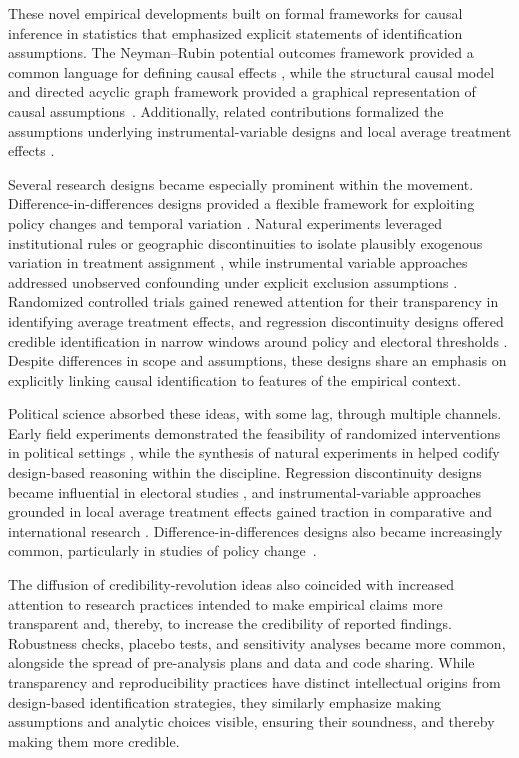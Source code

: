 \documentclass[12pt]{article}
\begin{document}
These novel empirical developments built on formal frameworks for causal inference in statistics that emphasized explicit statements of identification assumptions. The Neyman–Rubin potential outcomes framework provided a common language for defining causal effects \citep{rubin1974, holland1986}, while the structural causal model and directed acyclic graph framework provided a graphical representation of causal assumptions~\citep{pearl2009Causality}. Additionally, related contributions formalized the assumptions underlying instrumental-variable designs and local average treatment effects \citep{imbens1994identification}. 

Several research designs became especially prominent within the movement. Difference-in-differences designs provided a flexible framework for exploiting policy changes and temporal variation \citep{card1994minimumwage}. Natural experiments leveraged institutional rules or geographic discontinuities to isolate plausibly exogenous variation in treatment assignment \citep{dell2010persistent}, while instrumental variable approaches addressed unobserved confounding under explicit exclusion assumptions \citep{acemoglu2001colonial}. Randomized controlled trials gained renewed attention for their transparency in identifying average treatment effects, and regression discontinuity designs offered credible identification in narrow windows around policy and electoral thresholds \citep{lee2008rd}. Despite differences in scope and assumptions, these designs share an emphasis on explicitly linking causal identification to features of the empirical context.

Political science absorbed these ideas, with some lag, through multiple channels. Early field experiments demonstrated the feasibility of randomized interventions in political settings \citep{gerber2000field, wantchekon2003clientelism}, while the synthesis of natural experiments in \citet{dunning2012natural} helped codify design-based reasoning within the discipline. Regression discontinuity designs became influential in electoral studies \citep{eggers2015validity}, and instrumental-variable approaches grounded in local average treatment effects gained traction in comparative and international research \citep{sovey2011instrumental}. Difference-in-differences designs also became increasingly common, particularly in studies of policy change~\citep{bechtel2011lasting}.

The diffusion of credibility-revolution ideas also coincided with increased attention to research practices intended to make empirical claims more transparent and, thereby, to increase the credibility of reported findings. Robustness checks, placebo tests, and sensitivity analyses became more common, alongside the spread of pre-analysis plans and data and code sharing. While transparency and reproducibility practices have distinct intellectual origins from design-based identification strategies, they similarly emphasize making assumptions and analytic choices visible, ensuring their soundness, and thereby making them more credible.
\end{document}
